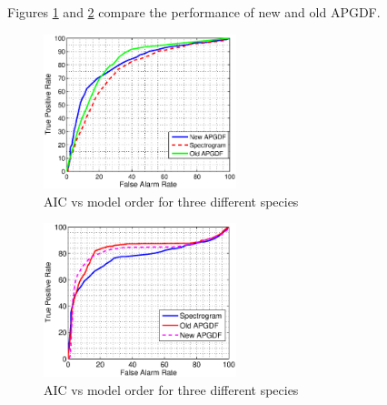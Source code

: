 \documentclass[a4paper]{article}
\begin{document}
 
 
 
 
 Figures \ref{fig:gd1_3} and \ref{fig:gd2_3} compare the performance of new and old APGDF.
 
 
 
 \begin{figure}[!ht]
	\centering
	\includegraphics[width=0.5\textwidth,height=7 cm] {gd1_3.eps}
	\caption{AIC vs model order for three different species }   
	\label{fig:gd1_3}
\end{figure} 

 
 
 \begin{figure}[!ht]
	\centering
	\includegraphics[width=0.5\textwidth,height=7 cm] {gd2_3.eps}
	\caption{AIC vs model order for three different species }   
	\label{fig:gd2_3}
\end{figure} 
 
 
 
 
\end{document}
